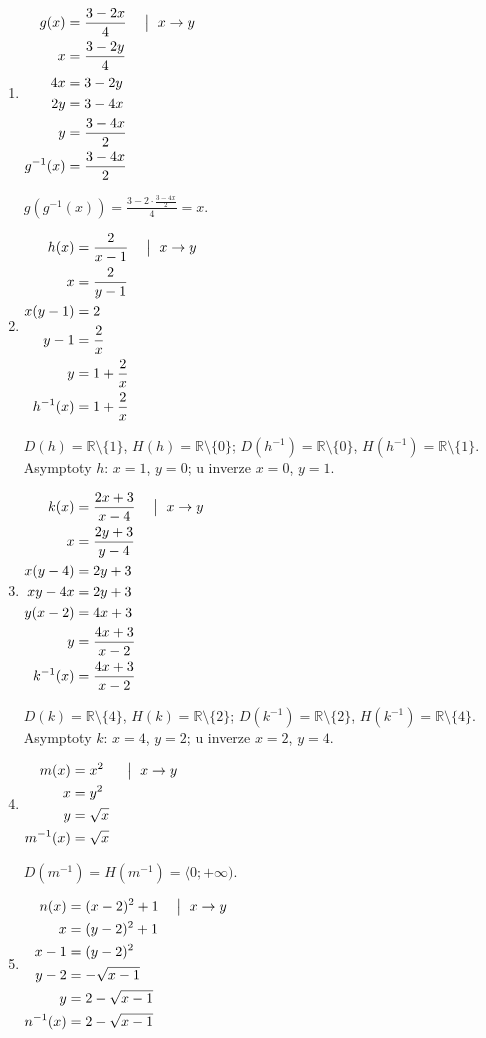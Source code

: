 \documentclass[11pt,a4paper]{article}
\begin{document}
\begin{zadaniReseniBox}[title={Domácí úkol}]
\begin{enumerate}[label=\alph*)]
Obě funkce mají definiční obor i obor hodnot $\mathbb R$.
\item
\(\displaystyle\begin{aligned}g(x)&=\frac{3-2x}{4} &&\bigm|\ x\to y\\x&=\frac{3-2y}{4}\\4x&=3-2y\\2y&=3-4x\\y&=\frac{3-4x}{2}\\g^{-1}(x)&=\frac{3-4x}{2}\end{aligned}\)

$g(g^{-1}(x))=\frac{3-2\cdot\frac{3-4x}{2}}{4}=x$.
\item
\(\displaystyle\begin{aligned}h(x)&=\frac{2}{x-1} &&\bigm|\ x\to y\\x&=\frac{2}{y-1}\\x(y-1)&=2\\y-1&=\frac{2}{x}\\y&=1+\frac{2}{x}\\h^{-1}(x)&=1+\frac{2}{x}\end{aligned}\)

$D(h)=\mathbb R\setminus\{1\}$, $H(h)=\mathbb R\setminus\{0\}$; $D(h^{-1})=\mathbb R\setminus\{0\}$, $H(h^{-1})=\mathbb R\setminus\{1\}$. Asymptoty $h$: $x=1$, $y=0$; u inverze $x=0$, $y=1$.
\item
\(\displaystyle\begin{aligned}k(x)&=\frac{2x+3}{x-4} &&\bigm|\ x\to y\\x&=\frac{2y+3}{y-4}\\x(y-4)&=2y+3\\xy-4x&=2y+3\\y(x-2)&=4x+3\\y&=\frac{4x+3}{x-2}\\k^{-1}(x)&=\frac{4x+3}{x-2}\end{aligned}\)

$D(k)=\mathbb R\setminus\{4\}$, $H(k)=\mathbb R\setminus\{2\}$; $D(k^{-1})=\mathbb R\setminus\{2\}$, $H(k^{-1})=\mathbb R\setminus\{4\}$. Asymptoty $k$: $x=4$, $y=2$; u inverze $x=2$, $y=4$.
\item
\(\displaystyle\begin{aligned}m(x)&=x^2 &&\bigm|\ x\to y\\x&=y^2\\y&=\sqrt{x}\\m^{-1}(x)&=\sqrt{x}\end{aligned}\)

$D(m^{-1})=H(m^{-1})=\langle0;+\infty)$.
\item
\(\displaystyle\begin{aligned}n(x)&=(x-2)^2+1 &&\bigm|\ x\to y\\x&=(y-2)^2+1\\x-1&=(y-2)^2\\y-2&=-\sqrt{x-1}\\y&=2-\sqrt{x-1}\\n^{-1}(x)&=2-\sqrt{x-1}\end{aligned}\)


\end{enumerate}
\end{zadaniReseniBox}
\end{document}
